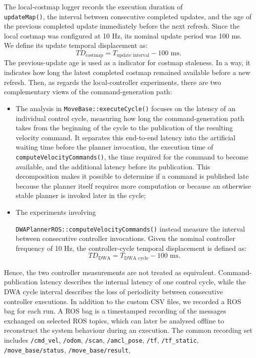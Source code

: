 \noindent The local-costmap logger records the execution duration of 
\\
\texttt{updateMap()}, the interval between consecutive completed updates, and the age of the previous completed update immediately before the next refresh. Since the local costmap was configured at 10 Hz, its nominal update period was 100 ms. We define its update temporal displacement as: 
\begin{equation}
TD_{\text{costmap}} = T_{\text{update interval}} - 100 \text{ ms}.
\end{equation}
The previous-update age is used as a indicator for costmap staleness. In a way, it indicates how long the latest completed costmap remained available before a new refresh.
Then, as regards the local-controller experiments, there are two complementary views of the command-generation path:
\begin{itemize}
    \item The analysis in \texttt{MoveBase::executeCycle()} focuses on the latency of an individual control cycle, measuring how long the command-generation path takes from the beginning of the cycle to the publication of the resulting velocity command. It separates this end-to-end latency into the artificial waiting time before the planner invocation, the execution time of \texttt{computeVelocityCommands()}, the time required for the command to become available, and the additional latency before its publication. This decomposition makes it possible to determine if a command is published late because the planner itself requires more computation or because an otherwise stable planner is invoked later in the cycle;
    \item The experiments involving 
    
    \texttt{DWAPlannerROS::computeVelocityCommands()} instead measure the interval between consecutive controller invocations. Given the nominal controller frequency of 10 Hz, the controller-cycle temporal displacement is defined as: 
    \begin{equation}
    TD_{\text{DWA}} = T_{\text{DWA cycle}} - 100 \text{ ms}.
    \end{equation}
\end{itemize}
Hence, the two controller measurements are not treated as equivalent. Command-publication latency describes the internal latency of one control cycle, while the DWA cycle interval describes the loss of periodicity between consecutive controller executions.
In addition to the custom CSV files, we recorded a ROS bag for each run. A ROS bag is a timestamped recording of the messages exchanged on selected ROS topics, which can later be analysed offline to reconstruct the system behaviour during an execution. The common recording set includes \texttt{/cmd\_vel}, \texttt{/odom}, \texttt{/scan}, \texttt{/amcl\_pose}, \texttt{/tf}, \texttt{/tf\_static}, \texttt{/move\_base/status}, \texttt{/move\_base/result}, 

